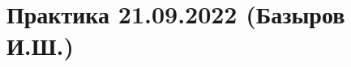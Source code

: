 \documentclass[main.tex]{subfiles}
\begin{document}

\section{Практика 21.09.2022 (Базыров И.Ш.)}
\end{document}
